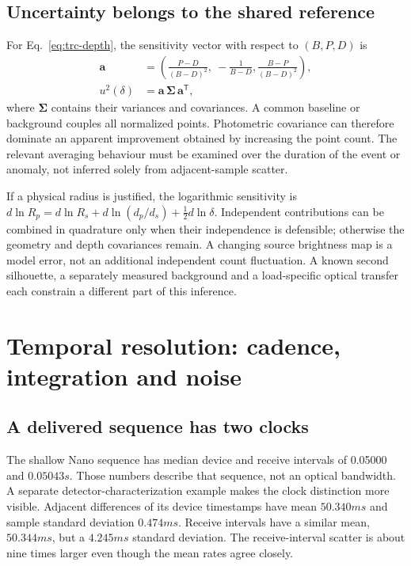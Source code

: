 \subsection{Uncertainty belongs to the shared reference}
For Eq.~\ref{eq:trc-depth}, the sensitivity vector with respect to $(B,P,D)$ is
\begin{equation}
\begin{aligned}
\bm{a}&=\left(\frac{P-D}{(B-D)^2},\ -\frac{1}{B-D},
\frac{B-P}{(B-D)^2}\right),
\\
 u^2(\delta)&=\bm{a}\,\bm{\Sigma}\,\bm{a}^{\mathsf T},
\end{aligned}
\label{eq:trc-uncertainty}
\end{equation}
where $\bm{\Sigma}$ contains their variances and covariances. A common baseline or background couples all normalized points. Photometric covariance can therefore dominate an apparent improvement obtained by increasing the point count\cite{pont2006}. The relevant averaging behaviour must be examined over the duration of the event or anomaly, not inferred solely from adjacent-sample scatter.

If a physical radius is justified, the logarithmic sensitivity is $d\ln R_p=d\ln R_s+d\ln(d_p/d_s)+\tfrac12d\ln\delta$. Independent contributions can be combined in quadrature only when their independence is defensible; otherwise the geometry and depth covariances remain. A changing source brightness map is a model error, not an additional independent count fluctuation. A known second silhouette, a separately measured background and a load-specific optical transfer each constrain a different part of this inference.

\section{Temporal resolution: cadence, integration and noise}
\subsection{A delivered sequence has two clocks}
The shallow Nano sequence has median device and receive intervals of 0.05000 and $0.05043\unit{s}$. Those numbers describe that sequence, not an optical bandwidth. A separate detector-characterization example makes the clock distinction more visible. Adjacent differences of its device timestamps have mean $50.340\unit{ms}$ and sample standard deviation $0.474\unit{ms}$. Receive intervals have a similar mean, $50.344\unit{ms}$, but a $4.245\unit{ms}$ standard deviation. The receive-interval scatter is about nine times larger even though the mean rates agree closely.

